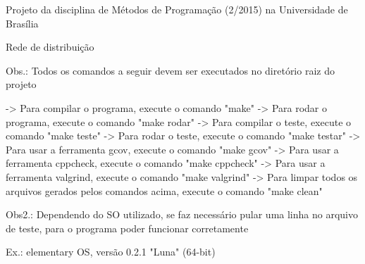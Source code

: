 Projeto da disciplina de Métodos de Programação (2/2015) na Universidade de Brasília

Rede de distribuição

Obs.\-: Todos os comandos a seguir devem ser executados no diretório raiz do projeto \begin{DoxyVerb}-> Para compilar o programa, execute o comando "make"
-> Para rodar o programa, execute o comando "make rodar"
-> Para compilar o teste, execute o comando "make teste"
-> Para rodar o teste, execute o comando "make testar"
-> Para usar a ferramenta gcov, execute o comando "make gcov"
-> Para usar a ferramenta cppcheck, execute o comando "make cppcheck"
-> Para usar a ferramenta valgrind, execute o comando "make valgrind"
-> Para limpar todos os arquivos gerados pelos comandos acima, execute o comando "make clean"
\end{DoxyVerb}


Obs2.\-: Dependendo do S\-O utilizado, se faz necessário pular uma linha no arquivo de teste, para o programa poder funcionar corretamente \begin{DoxyVerb}Ex.: elementary OS, versão 0.2.1 "Luna" (64-bit)\end{DoxyVerb}
 